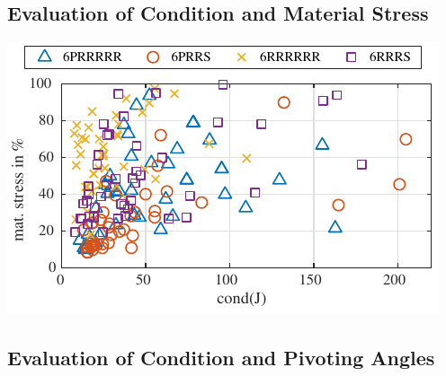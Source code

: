 \documentclass[fleqn,a4paper,10pt]{article}
\renewenvironment{figure}
  {\par\vspace{6pt}\noindent\minipage{\linewidth}}
  {\endminipage\par\vspace{6pt}}
\begin{document}
\begin{multicols}{2}
\subsection{Evaluation of Condition and Material Stress}

\begin{figure}
\centering
\includegraphics{./Bilder/figure_matstress_vs_condition.pdf}
\label{fig:eval_matstress_vs_condition}
\end{figure}





\subsection{Evaluation of Condition and Pivoting Angles}



\end{multicols}
\end{document}
